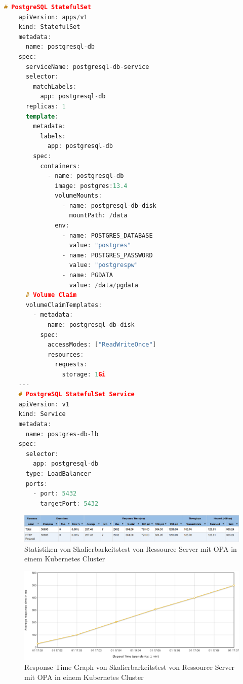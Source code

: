   \begin{lstlisting}[language=C++,frame=tb,caption={Deployment und Service von PostgreSQL als Datenbank für Keycloak},label=lst:DeploymentundServicevonPostgres]
    # PostgreSQL StatefulSet
    apiVersion: apps/v1
    kind: StatefulSet
    metadata:
      name: postgresql-db
    spec:
      serviceName: postgresql-db-service
      selector:
        matchLabels:
          app: postgresql-db
      replicas: 1
      template:
        metadata:
          labels:
            app: postgresql-db
        spec:
          containers:
            - name: postgresql-db
              image: postgres:13.4
              volumeMounts:
                - name: postgresql-db-disk
                  mountPath: /data
              env:
                - name: POSTGRES_DATABASE
                  value: "postgres"
                - name: POSTGRES_PASSWORD
                  value: "postgrespw"
                - name: PGDATA
                  value: /data/pgdata
      # Volume Claim
      volumeClaimTemplates:
        - metadata:
            name: postgresql-db-disk
          spec:
            accessModes: ["ReadWriteOnce"]
            resources:
              requests:
                storage: 1Gi
    ---
    # PostgreSQL StatefulSet Service
    apiVersion: v1
    kind: Service
    metadata:
      name: postgres-db-lb
    spec:
      selector:
        app: postgresql-db
      type: LoadBalancer
      ports:
        - port: 5432
          targetPort: 5432            
  \end{lstlisting}
  \bigskip

  \begin{figure}[H]
    \centering
    \includegraphics[width=1.0\textwidth]{gfx/statistik-skalierung-opa-k8s.png}
    \caption{Statistiken von Skalierbarkeitstest von Ressource Server mit OPA in einem Kubernetes Cluster}
    \label{fig:chapter04:statistik-skalierung-opa-k8s}
  \end{figure}

  \begin{figure}[H]
    \centering
    \includegraphics[width=1.0\textwidth]{gfx/flotResponseTimesOverTime-skalierung-opa-k8s.png}
    \caption{Response Time Graph von Skalierbarkeitstest von Ressource Server mit OPA in einem Kubernetes Cluster}
    \label{fig:chapter04:flotResponseTimesOverTime-skalierung-opa-k8s}
  \end{figure}

